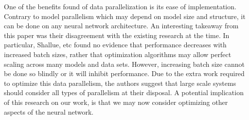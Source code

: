 \documentclass[11pt,twocolumn]{article}
\begin{document}
One of the benefits found of data parallelization is its ease of implementation. Contrary to model parallelism which may depend on model size and structure, it can be done on any neural network architecture. An interesting takeaway from this paper was their disagreement with the existing research at the time. In particular, Shallue, etc found no evidence that performance decreases with increased batch sizes, rather that optimization algorithms may allow perfect scaling across many models and data sets. However, increasing batch size cannot be done so blindly or it will inhibit performance. Due to the extra work required to optimize this data parallelism, the authors suggest that large scale systems should consider all types of parallelism at their disposal. A potential implication of this research on our work, is that we may now consider optimizing other aspects of the neural network. 
\end{document}
